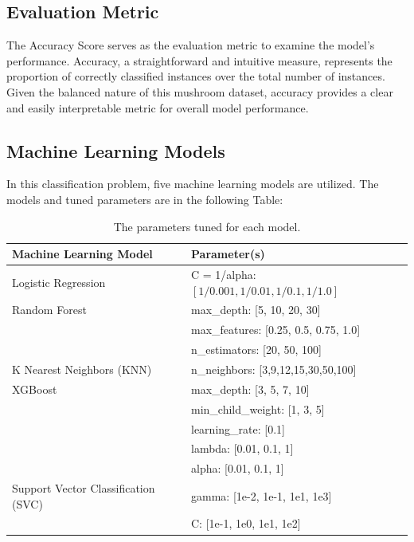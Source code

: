 \documentclass{article}
\begin{document}
\subsection{Evaluation Metric}
\hspace{0.5cm} The Accuracy Score serves as the evaluation metric to examine the model's performance. Accuracy, a straightforward and intuitive measure, represents the proportion of correctly classified instances over the total number of instances. Given the balanced nature of this mushroom dataset, accuracy provides a clear and easily interpretable metric for overall model performance.  

\subsection{Machine Learning Models}
\hspace{0.5cm} In this classification problem, five machine learning models are utilized. The models and tuned parameters are in the following Table:

\begin{table}[h]
\centering
\begin{tabular}{|l|l|} \hline
\textbf{Machine Learning Model} & \textbf{Parameter(s)} \\\hline
Logistic Regression & C = 1/alpha: $[1/0.001, 1/0.01, 1/0.1, 1/1.0]$\\ \hline
Random Forest & max\_depth: [5, 10, 20, 30] \\
 & max\_features: [0.25, 0.5, 0.75, 1.0] \\
 & n\_estimators: [20, 50, 100] \\ \hline
K Nearest Neighbors (KNN) & n\_neighbors: [3,9,12,15,30,50,100] \\ \hline
XGBoost & max\_depth: [3, 5, 7, 10] \\
 & min\_child\_weight: [1, 3, 5] \\
 & learning\_rate: [0.1] \\
 & lambda: [0.01, 0.1, 1] \\
 & alpha: [0.01, 0.1, 1] \\ \hline
Support Vector Classification (SVC) &  gamma: [1e-2, 1e-1, 1e1, 1e3] \\
 & C: [1e-1, 1e0, 1e1, 1e2] \\ \hline
\end{tabular}
\caption{\label{tab:widgets} The parameters tuned for each model.}
\end{table}
\end{document}
